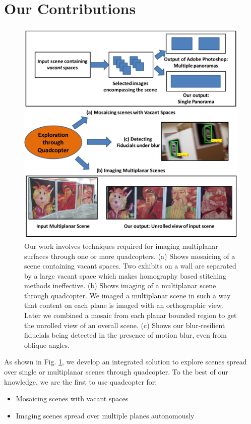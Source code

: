 \section{Our Contributions}
\begin{figure}[h!]
\centering
\includegraphics[width=0.98\linewidth]{figures/contributions2}
\caption[Our Contributions]{Our work involves techniques required for imaging
multiplanar surfaces through one or more quadcopters. (a) Shows mosaicing of a scene containing
vacant spaces. Two exhibits on a wall are separated by  a large vacant space
which makes homography based stitching methods ineffective. (b) Shows imaging
of a multiplanar scene through quadcopter. We imaged a multiplanar scene in such
a way that content on each plane is imaged with an orthographic view. Later we
combined a mosaic from each planar bounded region to get the  unrolled view of
an overall scene. (c) Shows our blur-resilient fiducials being detected in the
presence of motion blur, even from oblique angles.}
\label{fig:contributions}
\end{figure}

As shown in Fig. \ref{fig:contributions}, we develop an integrated solution to
explore scenes spread over single or multiplanar scenes through quadcopter. To
the best of our knowledge, we are the first to use quadcopter for:
\begin{itemize}
  \item Mosaicing scenes with vacant spaces  
  \item Imaging scenes spread over multiple planes autonomously   
\end{itemize}


